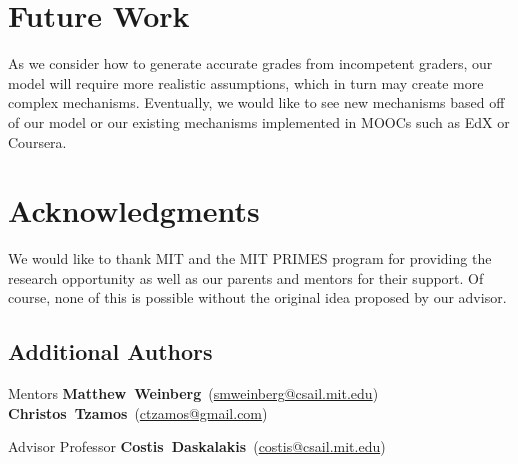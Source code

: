 \documentclass{sigchi}
\begin{document}
\section{Future Work}
As we consider how to generate accurate grades from incompetent graders, our model will require more realistic assumptions, which in turn may create more complex mechanisms.
Eventually, we would like to see new mechanisms based off of our model or our existing mechanisms implemented in MOOCs such as EdX or Coursera.


\section{Acknowledgments}
We would like to thank MIT and the MIT PRIMES program for providing the research opportunity as well as our parents and mentors for their support. Of course, none of this is possible without the original idea proposed by our advisor.

\subsection{Additional Authors}
Mentors \newline
\textbf{Matthew~Weinberg}~(\href{mailto:smweinberg@csail.mit.edu}{smweinberg@csail.mit.edu})\newline
\textbf{Christos~Tzamos}~(\href{mailto:ctzamos@gmail.com}{ctzamos@gmail.com})

Advisor \newline
Professor \textbf{Costis~Daskalakis}~(\href{mailto:costis@csail.mit.edu}{costis@csail.mit.edu})


%
%
%
%
\balance



\end{document}

